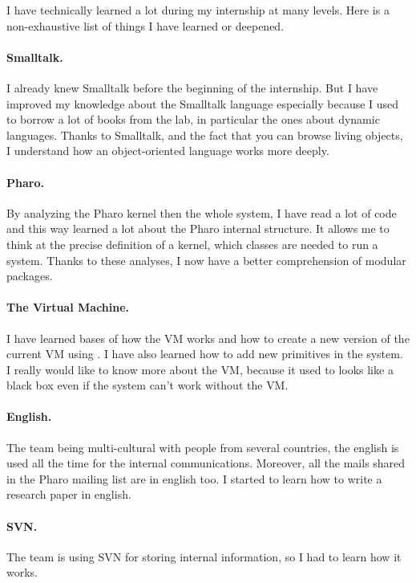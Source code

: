 I have technically learned a lot during my internship at many levels. Here is a non-exhaustive list of things I have learned or deepened.

\paragraph{Smalltalk.} I already knew \gls{Smalltalk} before the beginning of the internship. But I have improved my knowledge about the \gls{Smalltalk} language especially because I used to borrow a lot of books from the lab, in particular the ones about dynamic languages. Thanks to \gls{Smalltalk}, and the fact that you can browse living objects, I understand how an object-oriented language works more deeply.

\paragraph{Pharo.} By analyzing the \gls{Pharo} kernel then the whole system, I have read a lot of code and this way learned a lot about the \gls{Pharo} internal structure. It allows me to think at the precise definition of a kernel, which classes are needed to run a system. Thanks to these analyses, I now have a better comprehension of modular packages.

\paragraph{The Virtual Machine.} I have learned bases of how the \gls{VM} works and how to create a new version of the current \gls{VM} using . I have also learned how to add new primitives in the system. I really would like to know more about the \gls{VM}, because it used to looks like a black box even if the system can't work without the \gls{VM}.

\paragraph{English.} The team being multi-cultural with people from several countries, the english is used all the time for the internal communications. Moreover, all the mails shared in the Pharo mailing list are in english too. I started to learn how to write a research paper in english.

\paragraph{SVN.} The team is using \gls{SVN} for storing internal information, so I had to learn how it works.